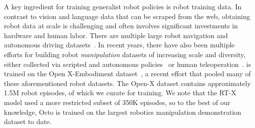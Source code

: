 A key ingredient for training generalist robot policies is robot training data. In contrast to vision and language data that can be scraped from the web, obtaining robot data at scale is challenging and often involves significant investments in hardware and human labor. There are multiple large robot navigation and autonomous driving datasets~\citep{geiger2012we,yu2020bdd100k,caesar2020nuscenes,sun2020scalability,shahGNMGeneralNavigation2023,karnan2022socially,triest2022tartandrive}. In recent years, there have also been multiple efforts for building robot \emph{manipulation} datasets of increasing scale and diversity, either collected via scripted and autonomous policies~\citep{dasari2020robonet, kalashnikov2018qt,kalashnikov2021scaling,cabi2019,pinto2016supersizing,gupta2018robot} or human teleoperation~\citep{mandlekar2018roboturk,mandlekar2023mimicgen,ebert2021bridge,walke2023bridgedata,jang2022bc,brohan2022rt,fang2023rh20t,bharadhwaj2023roboagent,rosetebeas2022latent,mees2023grounding,shafiullah2023dobbe}. \method{} is trained on the Open X-Embodiment dataset~\citep{open_x_embodiment_rt_x_2023}, a recent effort that pooled many of these aforementioned robot datasets. The Open-X dataset contains approximately 1.5M robot episodes, of which we curate \ntrajs{} for \method{} training. We note that the RT-X model \citep{open_x_embodiment_rt_x_2023} used a more restricted subset of 350K episodes, so to the best of our knowledge, Octo is trained on the largest robotics manipulation demonstration dataset to date.
